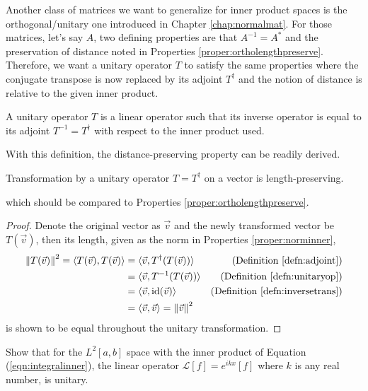 Another class of matrices we want to generalize for inner product spaces is the orthogonal/unitary one introduced in Chapter \ref{chap:normalmat}. For those matrices, let's say $A$, two defining properties are that $A^{-1} = A^*$ and the preservation of distance noted in Properties \ref{proper:ortholengthpreserve}. Therefore, we want a unitary operator $T$ to satisfy the same properties where the conjugate transpose is now replaced by its adjoint $T^\dag$ and the notion of distance is relative to the given inner product.
\begin{defn}
\label{defn:unitaryop}
A unitary operator $T$ is a linear operator such that its inverse operator is equal to its adjoint $T^{-1} = T^\dag$ with respect to the inner product used.
\end{defn}
With this definition, the distance-preserving property can be readily derived.
\begin{proper}
Transformation by a unitary operator $T = T^\dag$ on a vector is length-preserving.
\end{proper}
which should be compared to Properties \ref{proper:ortholengthpreserve}.
\begin{proof}
Denote the original vector as $\vec{v}$ and the newly transformed vector be $T(\vec{v})$, then its length, given as the norm in Properties \ref{proper:norminner},
\begin{align*}
\norm{T(\vec{v})}^2 = \langle T(\vec{v}), T(\vec{v}) \rangle &= \langle \vec{v}, T^\dag(T(\vec{v})) \rangle & \text{(Definition \ref{defn:adjoint})} \\
&= \langle \vec{v}, T^{-1}(T(\vec{v})) \rangle & \text{(Definition \ref{defn:unitaryop})} \\
&= \langle \vec{v}, \text{id}(\vec{v}) \rangle & \text{(Definition \ref{defn:inversetrans})} \\
&= \langle \vec{v}, \vec{v} \rangle = \norm{\vec{v}}^2
\end{align*}
is shown to be equal throughout the unitary transformation.
\end{proof}
\begin{exmp}
Show that for the $L^2[a,b]$ space with the inner product of Equation (\ref{eqn:integralinner}), the linear operator $\mathcal{L}[f] = e^{ikx}[f]$ where $k$ is any real number, is unitary.
\end{exmp}
